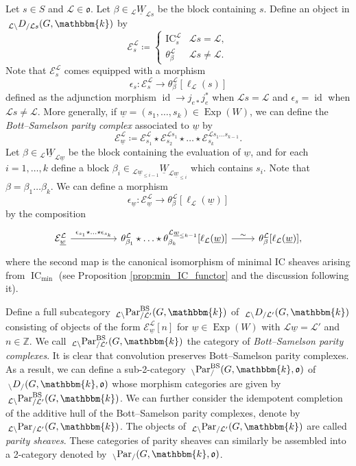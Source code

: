 \documentclass{amsart}
\newcommand{\Z}{\mathbb{Z}}
\renewcommand{\k}{\mathbbm{k}}
\newcommand{\scrE}{\mathcal{E}}
\newcommand{\scrL}{\mathcal{L}}
\DeclareMathOperator{\IC}{IC}
\DeclareMathOperator{\id}{id}
\newcommand{\fr}[1]{\mathfrak{#1}}
\DeclareMathOperator{\BS}{BS}
\newcommand{\DEE}[2]{\:_{#1 \backslash} D_{/ #2} }
\newcommand{\PEE}[2]{\:_{#1 \backslash} \textnormal{Par}_{/ #2} }
\DeclareMathOperator{\Exp}{Exp}
\newcommand{\uW}[2]{{}_{#1}\underline{W}_{#2}}
\newcommand{\uw}{\underline{w}}
\theoremstyle{definition}
\numberwithin{equation}{subsection}
\begin{document}
Let $s \in S$ and $\scrL \in \fr{o}$. Let $\beta \in \uW{\scrL}{\scrL s}$ be the block containing $s$.
Define an object in $\DEE{\scrL}{\scrL s} (G, \k)$ by
\[\scrE_s^{\scrL} \coloneq \begin{cases} \IC_s^{\scrL} & \scrL s = \scrL, \\ \theta_{\beta}^{\scrL} & \scrL s \neq \scrL. \end{cases}\]
Note that $\scrE_s^{\scrL}$ comes equipped with a morphism 
\[ \epsilon_s : \scrE_s^{\scrL} \to \theta_{\beta}^{\scrL} [\ell_{\scrL} (s)]\] 
defined as the adjunction morphism $\id \to j_{e*} j_e^*$ when $\scrL s = \scrL$ and $\epsilon_s = \id$ when $\scrL s \neq \scrL$.
More generally, if $\uw = (s_1, \ldots, s_k) \in \Exp (W)$, we can define the \emph{Bott--Samelson parity complex} associated to $\uw$ by
\[\scrE_{\uw}^{\scrL} \coloneq \scrE_{s_1}^{\scrL} \star \scrE_{s_2}^{\scrL s_1} \star \ldots \star \scrE_{s_k}^{\scrL s_1 \ldots s_{k-1}}.\]
Let $\beta \in \uW{\scrL}{\scrL \uw}$ be the block containing the evaluation of $\uw$, and for each $i =1, \ldots, k$ define a block $\beta_i \in \uW{\scrL \uw_{\leq i-1}}{\scrL \uw_{\leq i}}$ which contains $s_i$. 
Note that $\beta = \beta_1 \ldots \beta_k$.
We can define a morphism
\[\epsilon_{\uw} : \scrE_{\uw}^{\scrL} \to \theta_{\beta}^{\scrL} [\ell_{\scrL} (\uw)]\]
by the composition
\[\begin{tikzcd}
\scrE_{\uw}^{\scrL} \arrow[rr, "\epsilon_{s_1} \star \ldots \star \epsilon_{s_k}"] &  & { \theta^{\scrL}_{\beta_1} \star \ldots \star \theta^{\scrL \uw_{\leq k-1}}_{\beta_k} [\ell_{\scrL} (\uw)]} \arrow[r, "\sim"] & {\theta_{\beta}^{\scrL} [\ell_{\scrL} (\uw)]},
\end{tikzcd}\]   
where the second map is the canonical isomorphism of minimal IC sheaves arising from $\IC_{\min}$ (see Proposition \ref{prop:min_IC_functor} and the discussion following it).

Define a full subcategory $\PEE{\scrL}{\scrL'}^{\BS} (G, \k)$ of $\DEE{\scrL}{\scrL'} (G, \k)$ consisting of objects of the form $\scrE_{\uw}^{\scrL} [n]$ for $\uw \in \Exp (W)$ with $\scrL \uw = \scrL'$ and $n \in \Z$.
We call $\PEE{\scrL}{\scrL'}^{\BS} (G, \k)$ the category of \emph{Bott--Samelson parity complexes}. It is clear that convolution preserves Bott--Samelson parity complexes.
As a result, we can define a sub-2-category $\PEE{}{}^{\BS} (G, \k, \fr{o})$ of $\DEE{}{} (G, \k, \fr{o})$ whose morphism categories are given by  $\PEE{\scrL}{\scrL'}^{\BS} (G, \k)$.
We can further consider the idempotent completion of the additive hull of the Bott--Samelson parity complexes, denote by $\PEE{\scrL}{\scrL'} (G, \k)$.
The objects of $\PEE{\scrL}{\scrL'} (G, \k)$ are called \emph{parity sheaves}. 
These categories of parity sheaves can similarly be assembled into a 2-category denoted by $\PEE{}{} (G, \k, \fr{o})$.
\end{document}
